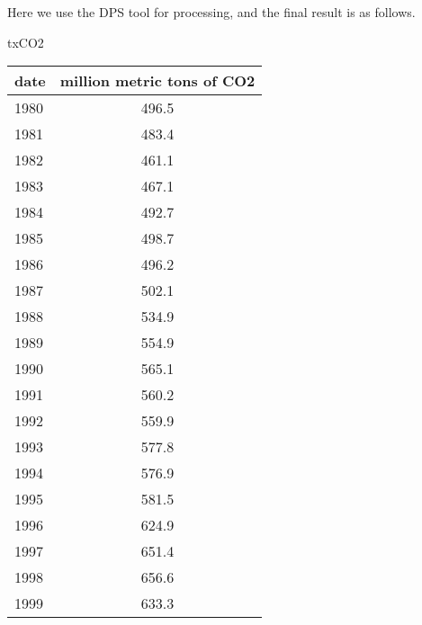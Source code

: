 \documentclass{mcmthesis}
\newcommand{\rmnum}[1]{\romannumeral #1}
\begin{document}
Here we use the DPS tool for processing, and the final result is as follows.

\newpage
\setcounter{page}{2}
\pagestyle{fancy} 
\rhead{\small\sffamily  \rmnum{\thepage}}





\begin{appendices}


\begin{minipage}{\textwidth}
  \begin{minipage}[t]{0.45\textwidth}
    \centering
      \makeatletter{}\makeatother\caption{txCO2}
      \begin{tabular}{|l|c|}
        \hline
        date & million metric tons of CO2 \\ \hline
        1980 & 496.5                      \\ \hline
        1981 & 483.4                      \\ \hline
        1982 & 461.1                      \\ \hline
        1983 & 467.1                      \\ \hline
        1984 & 492.7                      \\ \hline
        1985 & 498.7                      \\ \hline
        1986 & 496.2                      \\ \hline
        1987 & 502.1                      \\ \hline
        1988 & 534.9                      \\ \hline
        1989 & 554.9                      \\ \hline
        1990 & 565.1                      \\ \hline
        1991 & 560.2                      \\ \hline
        1992 & 559.9                      \\ \hline
        1993 & 577.8                      \\ \hline
        1994 & 576.9                      \\ \hline
        1995 & 581.5                      \\ \hline
        1996 & 624.9                      \\ \hline
        1997 & 651.4                      \\ \hline
        1998 & 656.6                      \\ \hline
        1999 & 633.3                      \\ \hline

\end{tabular}
\end{minipage}
\end{minipage}
\end{appendices}
\end{document}
